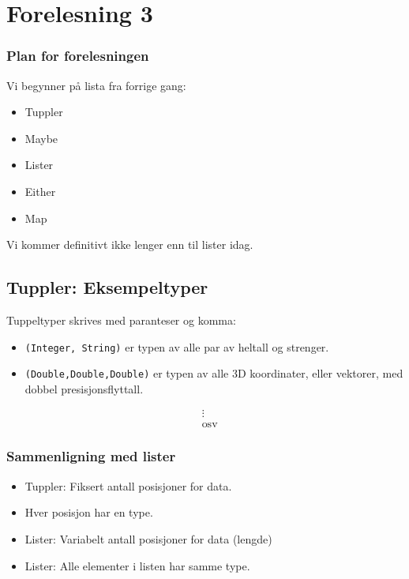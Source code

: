 \documentclass{article}
\begin{document}
    \section{Forelesning 3}

    \subsubsection{Plan for forelesningen}

    Vi begynner på lista fra forrige gang:

    \begin{itemize}
        \item Tuppler
        \item Maybe
        \item Lister
        \item Either
        \item Map
    \end{itemize}

    Vi kommer definitivt ikke lenger enn til lister idag.

    \subsection{Tuppler: Eksempeltyper}

    Tuppeltyper skrives med paranteser og komma:

    \begin{itemize}
        \item \texttt{(Integer, String)} er typen av alle par av heltall og strenger.
        \item \texttt{(Double,Double,Double)} er typen av alle 3D koordinater, eller vektorer, med dobbel presisjonsflyttall.
    \end{itemize}
    \begin{align*}
        & \vdots \\
        &\text{osv}
    \end{align*}

    \subsubsection{Sammenligning med lister}

    \begin{itemize}
        \item Tuppler: Fiksert antall posisjoner for data.
        \item Hver posisjon har en type.
        \item Lister: Variabelt antall posisjoner for data (lengde)
        \item Lister: Alle elementer i listen har samme type.
    \end{itemize}
\end{document}
